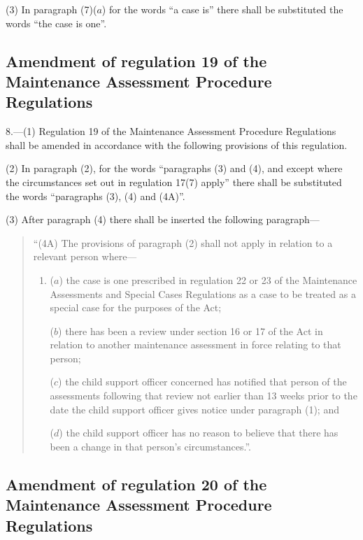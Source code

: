 \documentclass[a4paper]{article}
\begin{document}
(3) In paragraph (7)($a$) for the words “a case is” there shall be substituted the words “the case is one”.

\subsection[8. Amendment of regulation 19 of the Maintenance Assessment Procedure Regulations]{Amendment of regulation 19 of the Maintenance Assessment Procedure Regulations}

8.—(1) Regulation 19 of the Maintenance Assessment Procedure Regulations shall be amended in accordance with the following provisions of this regulation.

(2) In paragraph (2), for the words “paragraphs (3) and (4), and except where the circumstances set out in regulation 17(7) apply” there shall be substituted the words “paragraphs (3), (4) and (4A)”.

(3) After paragraph (4) there shall be inserted the following paragraph---
\begin{quotation}
“(4A) The provisions of paragraph (2) shall not apply in relation to a relevant person where---
\begin{enumerate}\item[]
($a$) the case is one prescribed in regulation 22 or 23 of the Maintenance Assessments and Special Cases Regulations as a case to be treated as a special case for the purposes of the Act;

($b$) there has been a review under section 16 or 17 of the Act in relation to another maintenance assessment in force relating to that person;

($c$) the child support officer concerned has notified that person of the assessments following that review not earlier than 13 weeks prior to the date the child support officer gives notice under paragraph (1); and

($d$) the child support officer has no reason to believe that there has been a change in that person’s circumstances.”.
\end{enumerate}
\end{quotation}

\subsection[9. Amendment of regulation 20 of the Maintenance Assessment Procedure Regulations]{Amendment of regulation 20 of the Maintenance Assessment Procedure Regulations}
\end{document}

